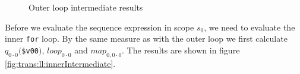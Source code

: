 \begin{figure}[!h]
\centering
{}
\qquad \quad
{}
\qquad \quad
{}
\label{fig:trans:ll:outerIntermediate}
\caption{Outer loop intermediate results}
\end{figure}

Before we evaluate the sequence expression in scope $s_0$, we need to evaluate the inner \texttt{for} loop. By the
same measure as with the outer loop we first calculate $q_{0\cdot 0}($\texttt{\$v00}$)$, $loop_{0 \cdot 0}$ and
$map_{0, 0 \cdot 0}$. The results are shown in figure \ref{fig:trans:ll:innerIntermediate}.

